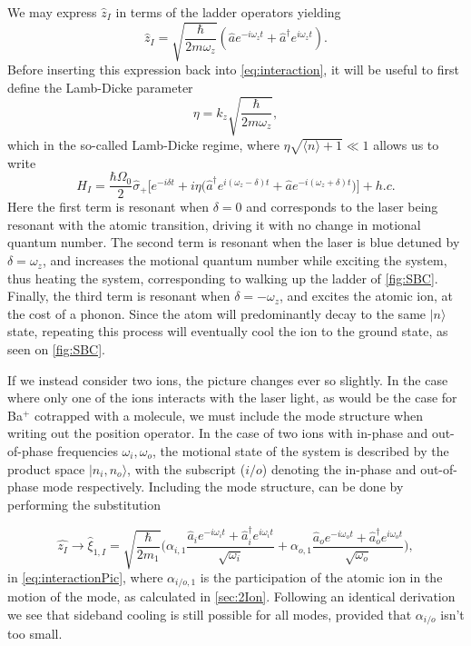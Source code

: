 We may express $\hat{z}_I$ in terms of the ladder operators yielding
\begin{equation}
    \hat{z}_I = \sqrt{\frac{\hbar}{2m\omega_z}}(\hat{a}e^{-i\omega_z t}+\hat{a}^\dagger e^{i\omega_z t}).
\end{equation}
Before inserting this expression back into \cref{eq:interaction}, it will be useful to first define the Lamb-Dicke parameter
\begin{equation}
    \eta = k_z\sqrt{\frac{\hbar}{2m\omega_z}},
\end{equation}
which in the so-called Lamb-Dicke regime, where $\eta\sqrt{\langle n \rangle +1} \ll 1$ \cite{PRS} allows us to write
\begin{equation}
    H_I = \frac{\hbar\Omega_0}{2}\hat{\sigma}_+\bigg[e^{-i\delta t} + i\eta\big(\hat{a}^\dagger e^{i(\omega_z -\delta)t}+\hat{a}e^{-i(\omega_z+\delta)t}\big)\bigg] + h.c.
    \label{eq:interactionPic}
\end{equation}
Here the first term is resonant when $\delta = 0$ and corresponds to the laser being resonant with the atomic transition, driving it with no change in motional quantum number. The second term is resonant when the laser is blue detuned by  $\delta = \omega_z$, and increases the motional quantum number while exciting the system, thus heating the system, corresponding to walking up the ladder of \cref{fig:SBC}.
Finally, the third term is resonant when $\delta = -\omega_z$, and excites the atomic ion, at the cost of a phonon. Since the atom will predominantly decay to the same $\vert n\rangle$ state, repeating this process will eventually cool the ion to the ground state, as seen on \cref{fig:SBC}.

If we instead consider two ions, the picture changes ever so slightly. In the case where only one of the ions interacts with the laser light, as would be the case for Ba$^+$ cotrapped with a molecule, we must include the mode structure when writing out the position operator. In the case of two ions with in-phase and out-of-phase frequencies $\omega_i,\omega_o$, the motional state of the system is described by the product space $\vert n_i,n_o\rangle$,
with the subscript ($i/o$) denoting the in-phase and out-of-phase mode respectively. Including the mode structure, can be done by performing the substitution

\begin{equation}
    \hat{z_I}\rightarrow\hat{\xi}_{1,I} = \sqrt{\frac{\hbar}{2m_1}}\bigg(\alpha_{i,1}\frac{\hat{a}_ie^{-i\omega_it}+\hat{a}_i^\dagger e^{i\omega_i t}}{\sqrt{\omega_i}}+\alpha_{o,1}\frac{\hat{a}_oe^{-i\omega_o t}+\hat{a}_o^\dagger e^{i\omega_o t}}{\sqrt{\omega_o}}\bigg),
\end{equation}
in \cref{eq:interactionPic}, where $\alpha_{i/o,1}$ is the participation of the atomic ion in the motion of the mode, as calculated in \cref{sec:2Ion}. Following an identical derivation we see that sideband cooling is still possible for all modes, provided that $\alpha_{i/o}$ isn't too small.

